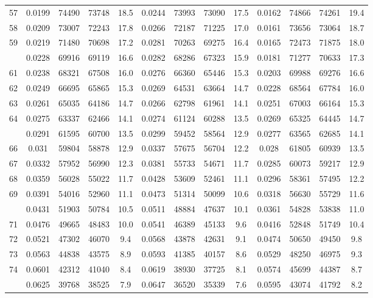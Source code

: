 \documentclass[
  14pt,
]{article}
\begin{document}
\begin{longtable}[t]{lcccccccccccc}
57 & 0.0199 & 74490 & 73748 & 18.5 & 0.0244 & 73993 & 73090 & 17.5 & 0.0162 & 74866 & 74261 & 19.4\\
58 & 0.0209 & 73007 & 72243 & 17.8 & 0.0266 & 72187 & 71225 & 17.0 & 0.0161 & 73656 & 73064 & 18.7\\
59 & 0.0219 & 71480 & 70698 & 17.2 & 0.0281 & 70263 & 69275 & 16.4 & 0.0165 & 72473 & 71875 & 18.0\\
\addlinespace
60 & 0.0228 & 69916 & 69119 & 16.6 & 0.0282 & 68286 & 67323 & 15.9 & 0.0181 & 71277 & 70633 & 17.3\\
61 & 0.0238 & 68321 & 67508 & 16.0 & 0.0276 & 66360 & 65446 & 15.3 & 0.0203 & 69988 & 69276 & 16.6\\
62 & 0.0249 & 66695 & 65865 & 15.3 & 0.0269 & 64531 & 63664 & 14.7 & 0.0228 & 68564 & 67784 & 16.0\\
63 & 0.0261 & 65035 & 64186 & 14.7 & 0.0266 & 62798 & 61961 & 14.1 & 0.0251 & 67003 & 66164 & 15.3\\
64 & 0.0275 & 63337 & 62466 & 14.1 & 0.0274 & 61124 & 60288 & 13.5 & 0.0269 & 65325 & 64445 & 14.7\\
\addlinespace
65 & 0.0291 & 61595 & 60700 & 13.5 & 0.0299 & 59452 & 58564 & 12.9 & 0.0277 & 63565 & 62685 & 14.1\\
66 & 0.031 & 59804 & 58878 & 12.9 & 0.0337 & 57675 & 56704 & 12.2 & 0.028 & 61805 & 60939 & 13.5\\
67 & 0.0332 & 57952 & 56990 & 12.3 & 0.0381 & 55733 & 54671 & 11.7 & 0.0285 & 60073 & 59217 & 12.9\\
68 & 0.0359 & 56028 & 55022 & 11.7 & 0.0428 & 53609 & 52461 & 11.1 & 0.0296 & 58361 & 57495 & 12.2\\
69 & 0.0391 & 54016 & 52960 & 11.1 & 0.0473 & 51314 & 50099 & 10.6 & 0.0318 & 56630 & 55729 & 11.6\\
\addlinespace
70 & 0.0431 & 51903 & 50784 & 10.5 & 0.0511 & 48884 & 47637 & 10.1 & 0.0361 & 54828 & 53838 & 11.0\\
71 & 0.0476 & 49665 & 48483 & 10.0 & 0.0541 & 46389 & 45133 & 9.6 & 0.0416 & 52848 & 51749 & 10.4\\
72 & 0.0521 & 47302 & 46070 & 9.4 & 0.0568 & 43878 & 42631 & 9.1 & 0.0474 & 50650 & 49450 & 9.8\\
73 & 0.0563 & 44838 & 43575 & 8.9 & 0.0593 & 41385 & 40157 & 8.6 & 0.0529 & 48250 & 46975 & 9.3\\
74 & 0.0601 & 42312 & 41040 & 8.4 & 0.0619 & 38930 & 37725 & 8.1 & 0.0574 & 45699 & 44387 & 8.7\\
\addlinespace
75 & 0.0625 & 39768 & 38525 & 7.9 & 0.0647 & 36520 & 35339 & 7.6 & 0.0595 & 43074 & 41792 & 8.2\\

\end{longtable}
\end{document}
